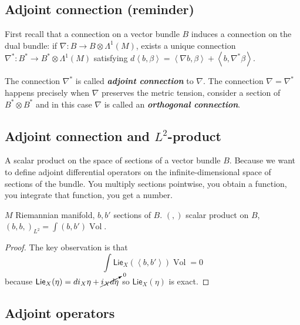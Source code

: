 \subsection{Adjoint connection (reminder)}

First recall that a connection on a vector bundle \(B\) induces a connection on the dual bundle: if \(\nabla: B \to B \otimes \Lambda^{1}(M)\), exists a unique connection \(\nabla^* : B ^*\to  B ^*  \otimes \Lambda^{1}(M)\) satisfying \(d \left< b , \beta\right>=\left<\nabla b, \beta\right>+ \left< b, \nabla ^* \beta\right>\).

The connection \(\nabla ^* \) is called \textit{\textbf{adjoint connection}} to \( \nabla\). The connection \(\nabla = \nabla ^*\) happens precisely when \(\nabla\) preserves the metric tension, consider a section of \( B ^* \otimes B ^* \) and in this case \(\nabla\) is called an \textit{\textbf{orthogonal connection}}.

\subsection{Adjoint connection and \(L^2\)-product}

\begin{upshot}\leavevmode
A scalar product on the space of sections of a vector bundle \(B\). Because we want to define adjoint differential operators on the infinite-dimensional space of sections of the bundle. You multiply sections pointwise, you obtain a function, you integrate that function, you get a number.
\end{upshot}

\(M\) Riemannian manifold, \(b, b'\) sections of \(B\).  \((,)\) scalar product on  \(B\), \((b,b,)_{L^2}=\int(b,b')\operatorname{Vol}\).

\begin{lemma}\leavevmode

\end{lemma}
\begin{proof}\leavevmode
The key observation is that
\[\int\mathsf{Lie}_X(\left<b,b'\right>)\operatorname{Vol}=0\]
because \(\mathsf{Lie}_X(\eta)=di_X\eta + \cancelto{0}{i_Xd\eta}\) so \(\mathsf{Lie}_X(\eta)\) is exact.
\end{proof}

\subsection{Adjoint operators}

